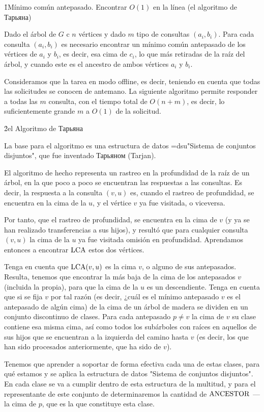 \h1{Mínimo común antepasado. Encontrar $O(1)$ en la línea (el algoritmo de Тарьяна)}

Dado el árbol de $G$ c $n$ vértices y dado $m$ tipo de consultas $(a_i, b_i)$. Para cada consulta $(a_i, b_i)$ es necesario encontrar un mínimo común antepasado de los vértices de $a_i$ y $b_i$, es decir, esa cima de $c_i$, lo que más retiradas de la raíz del árbol, y cuando este es el ancestro de ambos vértices $a_i$ y $b_i$.

Consideramos que la tarea en modo offline, es decir, teniendo en cuenta que todas las solicitudes se conocen de antemano. La siguiente algoritmo permite responder a todas las $m$ consulta, con el tiempo total de $O(n+m)$, es decir, lo suficientemente grande $m$ a $O(1)$ de la solicitud.

\h2{el Algoritmo de Тарьяна}

La base para el algoritmo es una estructura de datos \algohref=dsu{"Sistema de conjuntos disjuntos"}, que fue inventado Тарьяном (Tarjan).

El algoritmo de hecho representa un rastreo en la profundidad de la raíz de un árbol, en la que poco a poco se encuentran las respuestas a las consultas. Es decir, la respuesta a la consulta $(v,u)$ es, cuando el rastreo de profundidad, se encuentra en la cima de la $u$, y el vértice $v$ ya fue visitada, o viceversa.

Por tanto, que el rastreo de profundidad, se encuentra en la cima de $v$ (y ya se han realizado transferencias a sus hijos), y resultó que para cualquier consulta $(v,u)$ la cima de la $u$ ya fue visitada omisión en profundidad. Aprendamos entonces a encontrar $\rm LCA$ estos dos vértices.

Tenga en cuenta que ${\rm LCA}(v,u)$ es la cima $v$, o alguno de sus antepasados. Resulta, tenemos que encontrar la más baja de la cima de los antepasados $v$ (incluida la propia), para que la cima de la $u$ es un descendiente. Tenga en cuenta que si se fija $v$ por tal razón (es decir, ¿cuál es el mínimo antepasado $v$ es el antepasado de algún cima) de la cima de un árbol de madera se dividen en un conjunto discontinuo de clases. Para cada antepasado $p \not= v$ la cima de $v$ su clase contiene esa misma cima, así como todos los subárboles con raíces en aquellos de sus hijos que se encuentran a la izquierda del camino hasta $v$ (es decir, los que han sido procesados anteriormente, que ha sido de $v$).

Tenemos que aprender a soportar de forma efectiva cada una de estas clases, para qué estamos y se aplica la estructura de datos "Sistema de conjuntos disjuntos". En cada clase se va a cumplir dentro de esta estructura de la multitud, y para el representante de este conjunto de determinaremos la cantidad de $\rm ANCESTOR$ --- la cima de $p$, que es la que constituye esta clase.

